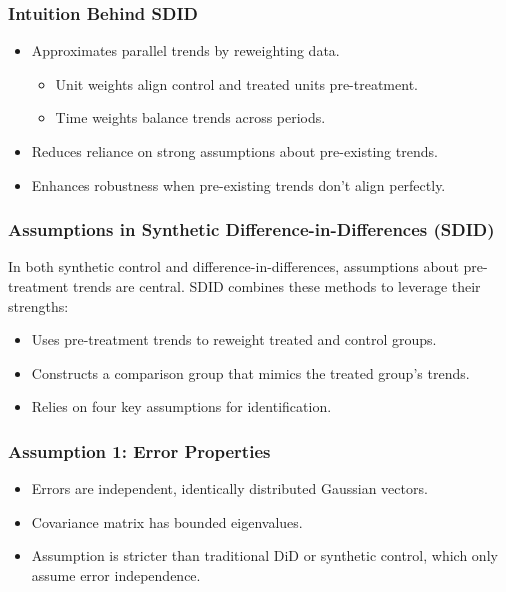 \documentclass{beamer}
\begin{document}
\begin{frame}
\frametitle{Intuition Behind SDID}

\begin{itemize}
    \item Approximates parallel trends by reweighting data.
        \begin{itemize}
            \item Unit weights align control and treated units pre-treatment.
            \item Time weights balance trends across periods.
        \end{itemize}
    \item Reduces reliance on strong assumptions about pre-existing trends.
    \item Enhances robustness when pre-existing trends don’t align perfectly.
\end{itemize}

\end{frame}


\begin{frame}
\frametitle{Assumptions in Synthetic Difference-in-Differences (SDID)}

In both synthetic control and difference-in-differences, assumptions about pre-treatment trends are central. SDID combines these methods to leverage their strengths:

\begin{itemize}
    \item Uses pre-treatment trends to reweight treated and control groups.
    \item Constructs a comparison group that mimics the treated group's trends.
    \item Relies on four key assumptions for identification.
\end{itemize}

\end{frame}


\begin{frame}
\frametitle{Assumption 1: Error Properties}

\begin{itemize}
    \item Errors are independent, identically distributed Gaussian vectors.
    \item Covariance matrix has bounded eigenvalues.
    \item Assumption is stricter than traditional DiD or synthetic control, which only assume error independence.
\end{itemize}

\end{frame}
\end{document}
